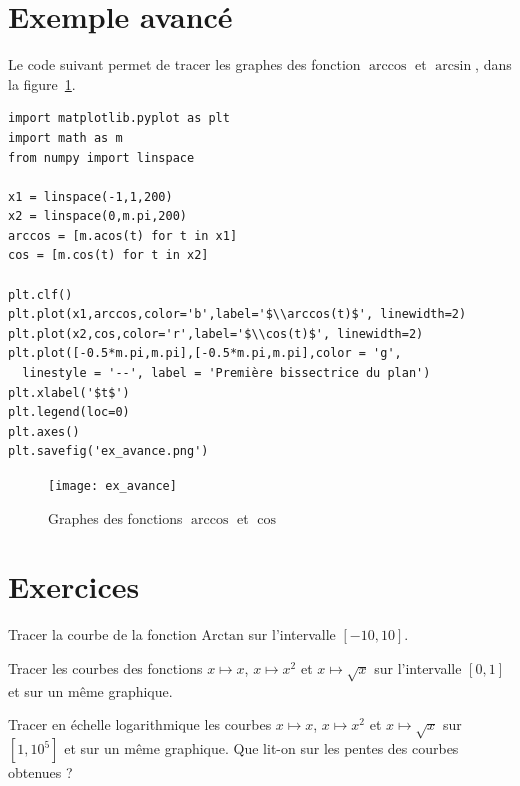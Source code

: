 \section{Exemple avancé}

Le code suivant permet de tracer les graphes des fonction $\arccos$ et $\arcsin$, dans la figure~\ref{fig:ex_avance}.
\begin{lstlisting}
import matplotlib.pyplot as plt
import math as m
from numpy import linspace

x1 = linspace(-1,1,200)
x2 = linspace(0,m.pi,200)
arccos = [m.acos(t) for t in x1]
cos = [m.cos(t) for t in x2]

plt.clf()
plt.plot(x1,arccos,color='b',label='$\\arccos(t)$', linewidth=2)
plt.plot(x2,cos,color='r',label='$\\cos(t)$', linewidth=2)
plt.plot([-0.5*m.pi,m.pi],[-0.5*m.pi,m.pi],color = 'g', 
  linestyle = '--', label = 'Première bissectrice du plan')
plt.xlabel('$t$')
plt.legend(loc=0)
plt.axes()
plt.savefig('ex_avance.png')
\end{lstlisting}

\begin{figure}[!h]
  \begin{center}
    \texttt{[image: ex\_avance]}
    \caption{Graphes des fonctions $\arccos$ et $\cos$}
    \label{fig:ex_avance}
  \end{center}
\end{figure}  

\section{Exercices}

  Tracer la courbe de la fonction $\mathrm{Arctan}$ sur l'intervalle $[-10,10]$. 

  Tracer les courbes des fonctions $x\mapsto x$, $x\mapsto x^2$ et $x\mapsto \sqrt{x}$ sur l'intervalle $[0,1]$ et sur un même graphique. 

  Tracer en échelle logarithmique les courbes $x \mapsto x$, $x \mapsto x^2$ et $x\mapsto \sqrt{x}$ sur $[1,10^5]$ et sur un même graphique. 
  Que lit-on sur les pentes des courbes obtenues ? 

